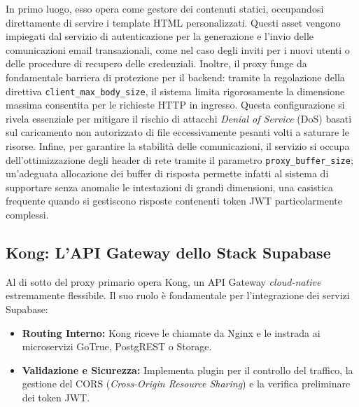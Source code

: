 \documentclass[12pt,a4paper]{report}
\begin{document}
In primo luogo, esso opera come gestore dei contenuti statici,
occupandosi direttamente di servire i template HTML personalizzati.
Questi asset vengono impiegati dal servizio di autenticazione per la
generazione e l'invio delle comunicazioni email transazionali, come
nel caso degli inviti per i nuovi utenti o delle procedure di
recupero delle credenziali. Inoltre, il proxy funge da fondamentale
barriera di protezione per il backend: tramite la regolazione della
direttiva \texttt{client\_max\_body\_size}, il sistema limita
rigorosamente la dimensione massima consentita per le richieste HTTP
in ingresso. Questa configurazione si rivela essenziale per mitigare
il rischio di attacchi \textit{Denial of Service} (DoS) basati sul
caricamento non autorizzato di file eccessivamente pesanti volti a
saturare le risorse. Infine, per garantire la stabilità delle
comunicazioni, il servizio si occupa dell'ottimizzazione degli header
di rete tramite il parametro \texttt{proxy\_buffer\_size};
un'adeguata allocazione dei buffer di risposta permette infatti al
sistema di supportare senza anomalie le intestazioni di grandi
dimensioni, una casistica frequente quando si gestiscono risposte
contenenti token JWT particolarmente complessi.

\subsection{Kong: L'API Gateway dello Stack Supabase}
Al di sotto del proxy primario opera Kong, un API Gateway \textit{cloud-native}
estremamente flessibile. Il suo ruolo è fondamentale per l'integrazione dei
servizi Supabase:
\begin{itemize}
  \item \textbf{Routing Interno:} Kong riceve le chiamate da Nginx e le
    instrada ai microservizi GoTrue, PostgREST o Storage.
  \item \textbf{Validazione e Sicurezza:} Implementa plugin per il controllo
    del traffico, la gestione del CORS (\textit{Cross-Origin Resource
    Sharing}) e la verifica preliminare dei token JWT.
\end{itemize}
\end{document}
